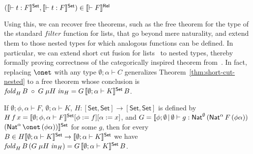 \documentclass[runningheads]{llncs}
\newcommand{\set}{\mathsf{Set}}
\begin{document}
\vspace*{-0.03in}

\begin{theorem}\label{thm:abstraction}
  $(\setsem{\vdash t : F},\setsem{\vdash t
  : F}) \in \relsem{\vdash F}$
\end{theorem}



Using this, we can recover free theorems, such as the free theorem for
the type of the standard $\mathit{filter}$ function for lists, that go
beyond mere naturality, and extend them to those nested types for
which analogous functions can be defined. In particular, we can extend
short cut fusion for lists~\cite{glp93} to nested types, thereby
formally proving correctness of the categorically inspired theorem
from~\cite{jg10}. In fact, replacing $\onet$ with any type
$\emptyset;\alpha \vdash C$ generalizes
Theorem~\ref{thm:short-cut-nested} to a free theorem whose conclusion
is $\mathit{fold}_{H}\, B \; \circ \; G\; \mu H \; \mathit{in}_{H} = G
\,\setsem{\emptyset;\alpha \vdash K}\, B$.
\begin{theorem}\label{thm:short-cut-nested}
If $\emptyset;\phi,\alpha \vdash F$, $\emptyset; \alpha
\vdash K$, 
$H : [\set,\set] \to [\set,\set]$ is defined by $H\,f\,x =
\setsem{\emptyset; \phi, \alpha \vdash F}[\phi := f][\alpha := x]$,
and $G = \llbracket \phi;\emptyset\,|\,\emptyset \vdash g :
\mathsf{Nat}^\emptyset\,(\mathsf{Nat}^\alpha\,F\,(\phi\alpha))$ \\
\noindent $(\Nat^\alpha\,\onet \, (\phi\alpha)) \rrbracket^\set$ for
some $g$, then for every $B \in H \setsem{\emptyset;\alpha \vdash K}
\rightarrow \setsem{\emptyset; \alpha \vdash K}$ we have
$\mathit{fold}_{H}\, B \, (G\; \mu H \; \mathit{in}_{H}) = G
\,\setsem{\emptyset;\alpha \vdash K}\, B$.
\end{theorem}
\end{document}
